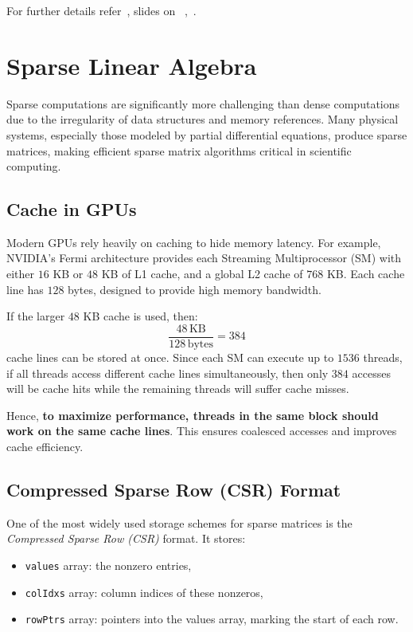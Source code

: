 \documentclass[12pt]{book}
\begin{document}
For further details refer~\cite{song2012enabling}, slides on ~\cite{Grigori2016CALUQR},~\cite{demmel2008communication}.

\section{Sparse Linear Algebra}

Sparse computations are significantly more challenging than dense computations due to the irregularity of data structures and memory references. Many physical systems, especially those modeled by partial differential equations, produce sparse matrices, making efficient sparse matrix algorithms critical in scientific computing.

\subsection*{Cache in GPUs}
Modern GPUs rely heavily on caching to hide memory latency. For example, NVIDIA's Fermi architecture provides each Streaming Multiprocessor (SM) with either $16$ KB or $48$ KB of L1 cache, and a global L2 cache of $768$ KB. Each cache line has $128$ bytes, designed to provide high memory bandwidth.

If the larger $48$ KB cache is used, then:
\[
\frac{48\,\text{KB}}{128\,\text{bytes}} = 384
\]
cache lines can be stored at once. Since each SM can execute up to $1536$ threads, if all threads access different cache lines simultaneously, then only $384$ accesses will be cache hits while the remaining threads will suffer cache misses.  

Hence, \textbf{to maximize performance, threads in the same block should work on the same cache lines}. This ensures coalesced accesses and improves cache efficiency.

\subsection*{Compressed Sparse Row (CSR) Format}
One of the most widely used storage schemes for sparse matrices is the \textit{Compressed Sparse Row (CSR)} format. It stores:
\begin{itemize}
    \item \texttt{values} array: the nonzero entries,
    \item \texttt{colIdxs} array: column indices of these nonzeros,
    \item \texttt{rowPtrs} array: pointers into the values array, marking the start of each row.
\end{itemize}
\end{document}
